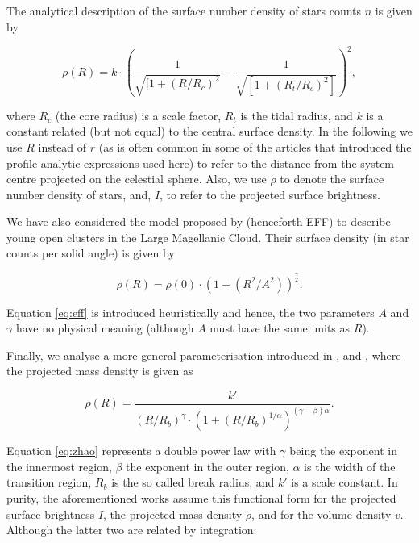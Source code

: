 The analytical description of the surface number density of stars counts $n$ is given by

\begin{equation}
  \rho(R) = k\cdot\left(\frac{1}{\sqrt{[1+(R/R_c)^2}}-\frac{1}{\sqrt{[1+(R_t/R_c)^2]}}\right)^2,
\end{equation}

where $R_c$ (the core radius) is a scale factor, $R_t$ is the tidal radius, and $k$ is a constant related (but not equal) to the central surface density. In the following we use $R$ instead of $r$ (as is often common in some of the articles that introduced the profile analytic expressions used here) to refer to the distance from the system centre projected on the celestial sphere. Also, we use $\rho$ to denote the surface number density of stars, and, $I$, to refer to the projected surface brightness.

We have also considered the model proposed by \cite{EFF1987} (henceforth EFF) to describe young open clusters in the Large Magellanic Cloud. Their surface density (in star counts per solid angle) is given by

\begin{equation}
\rho(R)=\rho(0)\cdot(1+(R^2/A^2))^\frac{\gamma}{2}.
\label{eq:eff}
\end{equation}

Equation \ref{eq:eff} is introduced heuristically and hence, the two parameters $A$ and $\gamma$ have no physical meaning (although $A$ must have the same units as $R$).

Finally, we analyse a more general parameterisation introduced in \cite{1995AJ....110.2622L}, \cite{1996AJ....111.1889B} and \cite{Zhao1997}, where the projected mass density is given as

\begin{equation}
  \rho(R) = \frac{k'}{(R/R_b)^{\gamma}\cdot(1+(R/R_b)^{1/\alpha})^{(\gamma-\beta)\alpha}}.
  \label{eq:zhao}
\end{equation}

Equation \ref{eq:zhao} represents a double power law with $\gamma$ being the exponent in the innermost region, $\beta$ the exponent in the outer region, $\alpha$ is the width of the transition region, $R_b$ is the so called break radius, and $k'$ is a scale constant. In purity, the aforementioned works assume this functional form for the projected surface brightness $I$, the projected mass density $\rho$, and for the volume density $v$. Although the latter two are related by integration:

